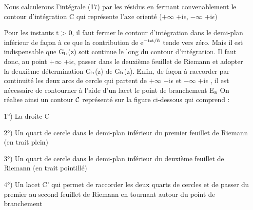 Nous calculerons l'intégrale (17) par les résidus en fermant convenablement le contour d'intégration C qui représente l'axe orienté ($+\infty$ +i$\epsilon$, $-\infty$ +i$\epsilon$)

Pour les instants t > 0, il faut fermer le contour d'intégration dans
le demi-plan inférieur de façon à ce que la contribution de e$^{-\text{izt}/\hbar}$
tende vers
zéro. Mais il est indispensable que G$_{\text{b}}$(z) soit continue le long du contour d'intégration. Il faut donc, au point $+\infty$ +i$\epsilon$, passer dans le deuxième feuillet de
Riemann et adopter la deuxième détermination G$_{\text{b}}$(z) de G$_{\text{b}}$(z). Enfin, de façon à
raccorder par continuité les deux arcs de cercle qui partent de $+\infty$ +i$\epsilon$ et $-\infty$ +i$\epsilon$
, il est nécessaire de contourner à l'aide d'un lacet le point de branchement E$_{\text{a}}$ On réalise ainsi un contour $\mathcal{C}$ représenté sur la figure ci-dessous
qui comprend :

1°) La droite C

2°) Un quart de cercle dans le demi-plan inférieur du premier
feuillet de Riemann (en trait plein)

3°) Un quart de cercle dans le demi-plan inférieur du deuxième
feuillet de Riemann (en trait pointillé)

4°) Un lacet C' qui permet de raccorder les deux quarts de
cercles et de passer du premier au second feuillet de Riemann en tournant
autour du point de branchement

\begin{center}  \end{center}

